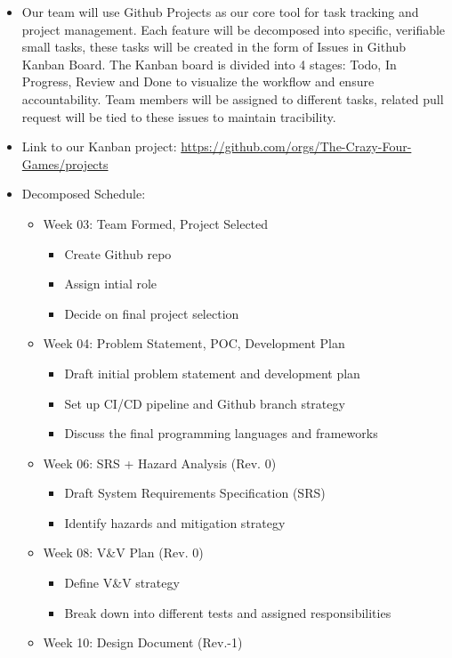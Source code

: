 \documentclass{article}
\begin{document}
\begin{itemize}
  \item Our team will use Github Projects as our core tool for task tracking and project management. Each feature will be decomposed into specific, verifiable small tasks, these tasks will be created in the form of Issues in Github Kanban Board. The Kanban board is divided into 4 stages: Todo, In Progress, Review and Done to visualize the workflow and ensure accountability. Team members will be assigned to different tasks, related pull request will be tied to these issues to maintain tracibility.
  \item Link to our Kanban project: \url{https://github.com/orgs/The-Crazy-Four-Games/projects}
  \item Decomposed Schedule:
	\begin{itemize}
		\item Week 03: Team Formed, Project Selected
			\begin{itemize}
			\item Create Github repo
			\item Assign intial role
			\item Decide on final project selection
			\end{itemize}		
		\item Week 04: Problem Statement, POC, Development Plan
			\begin{itemize}
			\item Draft initial problem statement and development plan
			\item Set up CI/CD pipeline and Github branch strategy
			\item Discuss the final programming languages and frameworks
			\end{itemize}
		\item Week 06: SRS + Hazard Analysis (Rev. 0)
			\begin{itemize}
			\item Draft System Requirements Specification (SRS)
			\item Identify hazards and mitigation strategy
			\end{itemize}
		\item Week 08: V\&V Plan (Rev. 0)
			\begin{itemize}
			\item Define V\&V strategy
			\item Break down into different tests and assigned responsibilities
			\end{itemize}
		\item Week 10: Design Document (Rev.-1)

\end{itemize}
\end{itemize}
\end{document}
